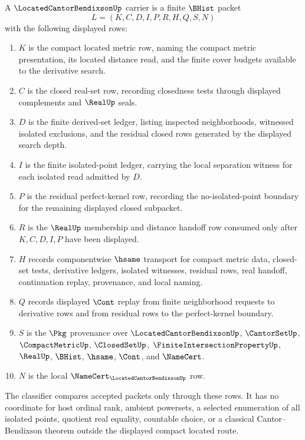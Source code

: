 \begin{definition}
\label{def:located-cantor-bendixson-carrier}
A $\LocatedCantorBendixsonUp$ carrier is a finite $\BHist$ packet
$$
L=(K,C,D,I,P,R,H,Q,S,N)
$$
with the following displayed rows:
\begin{enumerate}
\item $K$ is the compact located metric row, naming the compact metric presentation, its located distance read, and the finite cover budgets available to the derivative search.
\item $C$ is the closed real-set row, recording closedness tests through displayed complements and $\RealUp$ seals.
\item $D$ is the finite derived-set ledger, listing inspected neighborhoods, witnessed isolated exclusions, and the residual closed rows generated by the displayed search depth.
\item $I$ is the finite isolated-point ledger, carrying the local separation witness for each isolated read admitted by $D$.
\item $P$ is the residual perfect-kernel row, recording the no-isolated-point boundary for the remaining displayed closed subpacket.
\item $R$ is the $\RealUp$ membership and distance handoff row consumed only after $K,C,D,I,P$ have been displayed.
\item $H$ records componentwise $\hsame$ transport for compact metric data, closed-set tests, derivative ledgers, isolated witnesses, residual rows, real handoff, continuation replay, provenance, and local naming.
\item $Q$ records displayed $\Cont$ replay from finite neighborhood requests to derivative rows and from residual rows to the perfect-kernel boundary.
\item $S$ is the $\Pkg$ provenance over $\LocatedCantorBendixsonUp$, $\CantorSetUp$, $\CompactMetricUp$, $\ClosedSetUp$, $\FiniteIntersectionPropertyUp$, $\RealUp$, $\BHist$, $\hsame$, $\Cont$, and $\NameCert$.
\item $N$ is the local $\NameCert_{\LocatedCantorBendixsonUp}$ row.
\end{enumerate}
The classifier compares accepted packets only through these rows. It has no coordinate for host ordinal rank, ambient powersets, a selected enumeration of all isolated points, quotient real equality, countable choice, or a classical Cantor--Bendixson theorem outside the displayed compact located route.
\end{definition}

